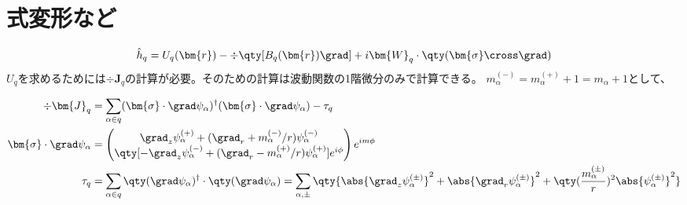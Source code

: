 \documentclass[a4paper,11pt,uplatex]{jsarticle}%
\begin{document}
\section{式変形など}

\begin{equation}
  \hat{h}_q = U_q(\bm{r}) - \div\qty[B_q(\bm{r})\grad] + i\bm{W}_q\cdot\qty(\bm{\sigma}\cross \grad)
\end{equation}
$U_q$を求めるためには$\div{\bm{J}}_q$の計算が必要。そのための計算は波動関数の1階微分のみで計算できる。
$m_{\alpha}^{(-)}=m_{\alpha}^{(+)}+1 = m_{\alpha}+1$として、

\begin{align}
  \div{\bm{J}}_q                   & = \sum_{\alpha\in q}(\bm{\sigma}\cdot\grad\psi_\alpha)^{\dagger}(\bm{\sigma}\cdot\grad\psi_\alpha) - \tau_q                                                                                                                                              \\
  \bm{\sigma}\cdot\grad\psi_\alpha & =
  \begin{pmatrix}
    \grad_z\psi_\alpha^{(+)} + (\grad_r + m_\alpha^{(-)}/r)\psi_\alpha^{(-)} \\
    \qty[-\grad_z\psi_\alpha^{(-)} + (\grad_r - m_\alpha^{(+)} /r)\psi_\alpha^{(+)}]e^{i\phi}
  \end{pmatrix}e^{im\phi}                                                                                                                                                                      \\
  \tau_q                           & = \sum_{\alpha\in q}\qty(\grad\psi_\alpha)^{\dagger}\cdot\qty(\grad\psi_\alpha) = \sum_{\alpha,\pm}\qty{\abs{\grad_z\psi_{\alpha}^{(\pm)}}^2 + \abs{\grad_r\psi_{\alpha}^{(\pm)}}^2 + \qty(\frac{m_{\alpha}^{(\pm)}}{r})^2\abs{\psi_{\alpha}^{(\pm)}}^2}
\end{align}
\newpage
\end{document}
